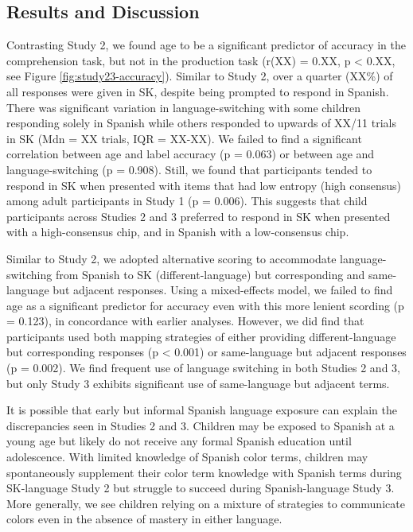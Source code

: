 \documentclass[
  english,
  ,man,floatsintext]{apa6}
\begin{document}
\hypertarget{results-and-discussion-2}{%
\subsection{Results and Discussion}\label{results-and-discussion-2}}

Contrasting Study 2, we found age to be a significant predictor of accuracy in the comprehension task, but not in the production task (r(XX) = 0.XX, p \textless{} 0.XX, see Figure \ref{fig:study23-accuracy}). Similar to Study 2, over a quarter (XX\%) of all responses were given in SK, despite being prompted to respond in Spanish. There was significant variation in language-switching with some children responding solely in Spanish while others responded to upwards of XX/11 trials in SK (Mdn = XX trials, IQR = XX-XX). We failed to find a significant correlation between age and label accuracy (p = 0.063) or between age and language-switching (p = 0.908). Still, we found that participants tended to respond in SK when presented with items that had low entropy (high consensus) among adult participants in Study 1 (p = 0.006). This suggests that child participants across Studies 2 and 3 preferred to respond in SK when presented with a high-consensus chip, and in Spanish with a low-consensus chip.

Similar to Study 2, we adopted alternative scoring to accommodate language-switching from Spanish to SK (different-language) but corresponding and same-language but adjacent responses. Using a mixed-effects model, we failed to find age as a significant predictor for accuracy even with this more lenient scording (p = 0.123), in concordance with earlier analyses. However, we did find that participants used both mapping strategies of either providing different-language but corresponding responses (p \textless{} 0.001) or same-language but adjacent responses (p = 0.002). We find frequent use of language switching in both Studies 2 and 3, but only Study 3 exhibits significant use of same-language but adjacent terms.

It is possible that early but informal Spanish language exposure can explain the discrepancies seen in Studies 2 and 3. Children may be exposed to Spanish at a young age but likely do not receive any formal Spanish education until adolescence. With limited knowledge of Spanish color terms, children may spontaneously supplement their color term knowledge with Spanish terms during SK-language Study 2 but struggle to succeed during Spanish-language Study 3. More generally, we see children relying on a mixture of strategies to communicate colors even in the absence of mastery in either language.
\end{document}

